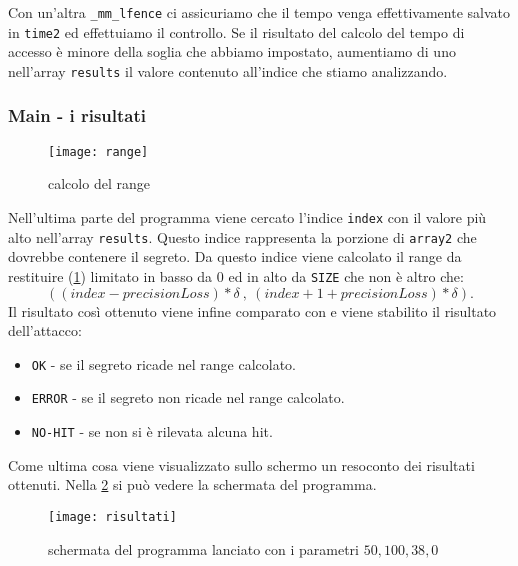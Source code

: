 				Con un'altra \texttt{\_mm\_lfence} ci assicuriamo che il tempo venga effettivamente salvato in \texttt{time2} ed effettuiamo il controllo. Se il risultato del calcolo del tempo di accesso è minore della soglia che abbiamo impostato, aumentiamo di uno nell'array \texttt{results} il valore  contenuto all'indice che stiamo analizzando.
				
				\subsubsection{Main - i risultati}
				
				\begin{figure}[b]
					\begin{center}
						\texttt{[image: range]}
						\caption{calcolo del range}
						\label{fig:range}
					\end{center}
				\end{figure}
				
				Nell'ultima parte del programma viene cercato l'indice \texttt{index} con il valore più alto nell'array \texttt{results}. Questo indice rappresenta la porzione di \texttt{array2} che dovrebbe contenere il segreto. Da questo indice viene calcolato il range da restituire (\cref{fig:range}) limitato in basso da $0$ ed in alto da \texttt{SIZE} che non è altro che: $$((index - precisionLoss) * \delta\ ,\ (index + 1 + precisionLoss) * \delta).$$ Il risultato così ottenuto viene infine comparato con  e viene stabilito il risultato dell'attacco:
				
				\begin{itemize}
					\item \texttt{OK} - se il segreto ricade nel range calcolato.
					\item \texttt{ERROR} - se il segreto non ricade nel range calcolato.
					\item \texttt{NO-HIT} - se non si è rilevata alcuna hit.
				\end{itemize}
				
				Come ultima cosa viene visualizzato sullo schermo un resoconto dei risultati ottenuti. Nella \cref{fig:schermata} si può vedere la schermata del programma.
				
				\begin{figure}
					\begin{center}
						\texttt{[image: risultati]}
						\caption[schermata di SPARK]{schermata del programma lanciato con i parametri $50,100,38,0$}
						\label{fig:schermata}
					\end{center}
				\end{figure}
			
